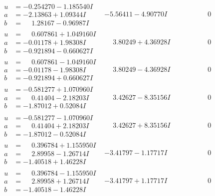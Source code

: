 \documentclass[1p]{elsarticle_modified}
\theoremstyle{definition}
\begin{document}
$$\begin{array}{c|c|c}
\begin{aligned}
u &= -0.254270 - 1.185540 I \\
a &= -2.13863 + 1.09344 I \\
b &= \phantom{-}1.28167 - 0.96987 I\end{aligned}
 & -5.56411 - 4.90770 I & \phantom{-0.000000 } 0 \\ \hline\begin{aligned}
u &= \phantom{-}0.607861 + 1.049160 I \\
a &= -0.01178 + 1.98308 I \\
b &= -0.921894 - 0.660627 I\end{aligned}
 & \phantom{-}3.80249 + 4.36928 I & \phantom{-0.000000 } 0 \\ \hline\begin{aligned}
u &= \phantom{-}0.607861 - 1.049160 I \\
a &= -0.01178 - 1.98308 I \\
b &= -0.921894 + 0.660627 I\end{aligned}
 & \phantom{-}3.80249 - 4.36928 I & \phantom{-0.000000 } 0 \\ \hline\begin{aligned}
u &= -0.581277 + 1.070960 I \\
a &= \phantom{-}0.41404 - 2.18203 I \\
b &= -1.87012 + 0.52084 I\end{aligned}
 & \phantom{-}3.42627 - 8.35156 I & \phantom{-0.000000 } 0 \\ \hline\begin{aligned}
u &= -0.581277 - 1.070960 I \\
a &= \phantom{-}0.41404 + 2.18203 I \\
b &= -1.87012 - 0.52084 I\end{aligned}
 & \phantom{-}3.42627 + 8.35156 I & \phantom{-0.000000 } 0 \\ \hline\begin{aligned}
u &= \phantom{-}0.396784 + 1.155950 I \\
a &= \phantom{-}2.89958 - 1.26714 I \\
b &= -1.40518 + 1.46228 I\end{aligned}
 & -3.41797 - 1.17717 I & \phantom{-0.000000 } 0 \\ \hline\begin{aligned}
u &= \phantom{-}0.396784 - 1.155950 I \\
a &= \phantom{-}2.89958 + 1.26714 I \\
b &= -1.40518 - 1.46228 I\end{aligned}
 & -3.41797 + 1.17717 I & \phantom{-0.000000 } 0 \\ \hline\begin{aligned}

\end{aligned}
\end{array}$$
\end{document}
